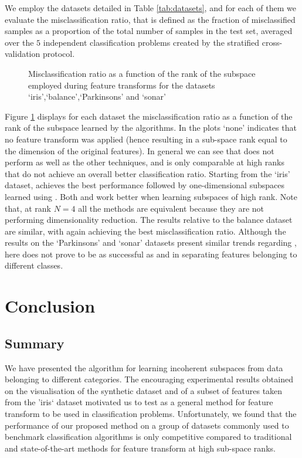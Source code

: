\documentclass{article}
\def \nDim{N} 			%
\begin{document}
We employ the datasets detailed in Table \ref{tab:datasets}, and for each of them we evaluate the misclassification ratio, that is defined as the fraction of misclassified samples as a proportion of the total number of samples in the test set, averaged over the $5$ independent classification problems created by the stratified cross-validation protocol.
\begin{figure}
\centering
{}
\caption{\label{fig:class} Misclassification ratio as a function of the rank of the subspace employed during feature transforms for the datasets  `iris',`balance',`Parkinsons' and `sonar'}
\end{figure}

Figure \ref{fig:class} displays for each dataset the misclassification ratio as a function of the rank of the subspace learned by the algorithms. In the plots `none' indicates that no feature transform was applied (hence resulting in a sub-space rank equal to the dimension of the original features). In general we can see that  does not perform as well as the other techniques, and is only comparable at high ranks that do not achieve an overall better classification ratio. Starting from the `iris' dataset,  achieves the best performance followed by one-dimensional subspaces learned using . Both  and  work better when learning subspaces of high rank. Note that, at rank $\nDim=4$ all the methods are equivalent because they are not performing dimensionality reduction. The results relative to the balance dataset are similar, with again  achieving the best misclassification ratio. Although the results on the `Parkinsons' and `sonar' datasets present similar trends regarding , here  does not prove to be as successful as  and  in separating features belonging to different classes. 

\section{Conclusion}\label{sec:end}
\subsection{Summary}
We have presented the  algorithm for learning incoherent subspaces from data belonging to different categories. The encouraging experimental results obtained on the visualisation of the synthetic dataset and of a subset of features taken from the 'iris` dataset motivated us to test  as a general method for feature transform to be used in classification problems. Unfortunately, we found that the performance of our proposed method on a group of datasets commonly used to benchmark classification algorithms is only competitive compared to traditional and state-of-the-art methods for feature transform at high sub-space ranks. 
\end{document}
